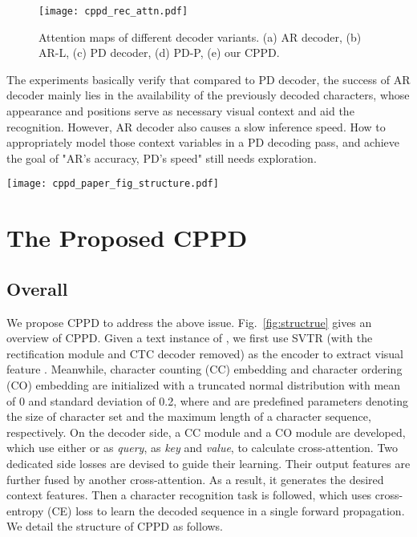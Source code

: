 \documentclass[10pt,journal,compsoc]{IEEEtran}
\begin{document}
\begin{figure}[t] 
\centering
\texttt{[image: cppd\_rec\_attn.pdf]}  
\caption{Attention maps of different decoder variants. (a) AR decoder, (b) AR-L, (c) PD decoder, (d) PD-P, (e) our CPPD.}  
\label{fig:vis1}  
\end{figure}

The experiments basically verify that compared to PD decoder, the success of AR decoder mainly lies in the availability of the previously decoded characters, whose appearance and positions serve as necessary visual context and aid the recognition. However, AR decoder also causes a slow inference speed. How to appropriately model those context variables in a PD decoding pass, and achieve the goal of "AR's accuracy, PD's speed" still needs exploration. 


\begin{figure*}[ht]  
\centering  
\texttt{[image: cppd\_paper\_fig\_structure.pdf]}  
\caption{An overview of CPPD. The decoder accepts visual features, character counting and ordering embeddings. Cross-attention and corresponding side losses are equipped to guide model learning. The right side shows details of the character counting and ordering modules, where the red line denotes either character counting or ordering embeddings, depending on which module is employed.} 
\label{fig:structrue}  
\end{figure*}

\section{The Proposed CPPD}
\label{sec:formatting}

\subsection{Overall}
We propose CPPD to address the above issue. Fig.~\ref{fig:structrue} gives an overview of CPPD. Given a text instance of , we first use SVTR \cite{duijcai2022svtr} (with the rectification module and CTC decoder removed) as the encoder to extract visual feature . Meanwhile, character counting (CC) embedding  and character ordering (CO) embedding  are initialized with a truncated normal distribution with mean of 0 and standard deviation of 0.2, where  and  are predefined parameters denoting the size of character set and the maximum length of a character sequence, respectively. On the decoder side, a CC module and a CO module are developed, which use either  or  as \emph{query},  as \emph{key} and \emph{value}, to calculate cross-attention. Two dedicated side losses are devised to guide their learning. Their output features are further fused by another cross-attention. As a result, it generates the desired context features. Then a character recognition task is followed, which uses cross-entropy (CE) loss to learn the decoded sequence in a single forward propagation. We detail the structure of CPPD as follows. 
\end{document}

